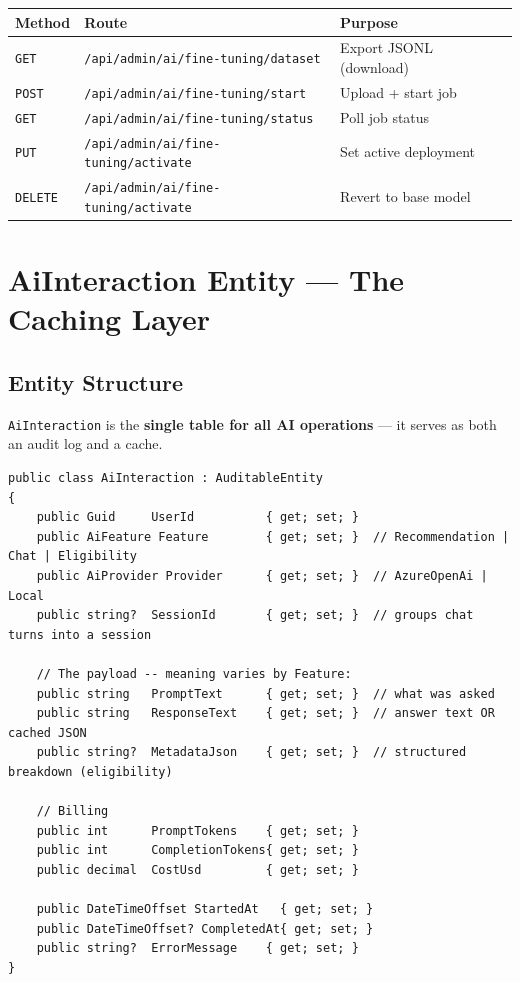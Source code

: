 \documentclass[11pt,a4paper]{article}
\begin{document}
\begin{center}
\begin{tabular}{lll}
\toprule
\textbf{Method} & \textbf{Route} & \textbf{Purpose}\\
\midrule
\texttt{GET}    & \texttt{/api/admin/ai/fine-tuning/dataset}  & Export JSONL (download)\\
\texttt{POST}   & \texttt{/api/admin/ai/fine-tuning/start}    & Upload + start job\\
\texttt{GET}    & \texttt{/api/admin/ai/fine-tuning/status}   & Poll job status\\
\texttt{PUT}    & \texttt{/api/admin/ai/fine-tuning/activate} & Set active deployment\\
\texttt{DELETE} & \texttt{/api/admin/ai/fine-tuning/activate} & Revert to base model\\
\bottomrule
\end{tabular}
\end{center}

\section{AiInteraction Entity --- The Caching Layer}

\subsection{Entity Structure}

\texttt{AiInteraction} is the \textbf{single table for all AI operations} ---
it serves as both an audit log and a cache.

\begin{lstlisting}[language={[Sharp]C},caption={Domain/Entities/AI.cs (condensed)}]
public class AiInteraction : AuditableEntity
{
    public Guid     UserId          { get; set; }
    public AiFeature Feature        { get; set; }  // Recommendation | Chat | Eligibility
    public AiProvider Provider      { get; set; }  // AzureOpenAi | Local
    public string?  SessionId       { get; set; }  // groups chat turns into a session

    // The payload -- meaning varies by Feature:
    public string   PromptText      { get; set; }  // what was asked
    public string   ResponseText    { get; set; }  // answer text OR cached JSON
    public string?  MetadataJson    { get; set; }  // structured breakdown (eligibility)

    // Billing
    public int      PromptTokens    { get; set; }
    public int      CompletionTokens{ get; set; }
    public decimal  CostUsd         { get; set; }

    public DateTimeOffset StartedAt   { get; set; }
    public DateTimeOffset? CompletedAt{ get; set; }
    public string?  ErrorMessage    { get; set; }
}
\end{lstlisting}
\end{document}
